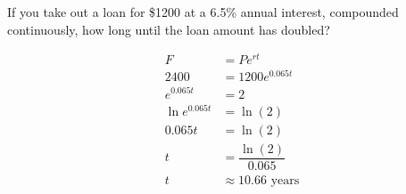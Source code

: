 \documentclass[11pt,letterpaper]{article}
\begin{document}
\newpage



 If you take out a loan for \$1200 at a 6.5\% annual interest, compounded continuously, how long until the loan amount has doubled?  \pspace

\sol 
	\[
	\begin{aligned}
	F&= P e^{rt} \\[0.3cm]
	2400&= 1200 e^{0.065 t} \\[0.3cm]
	e^{0.065 t}&= 2 \\[0.3cm]
	\ln e^{0.065 t}&= \ln(2) \\[0.3cm]
	0.065t&= \ln(2) \\[0.3cm]
	t&= \dfrac{\ln(2)}{0.065} \\[0.3cm]
	t&\approx 10.66 \text{ years}
	\end{aligned}
	\]
\end{document}
